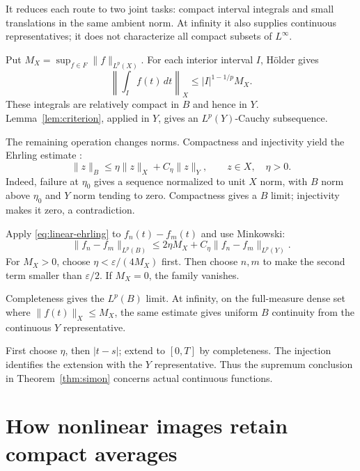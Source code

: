 \documentclass[12pt,reqno]{amsart}
\begin{document}
It reduces each route to two joint tasks: compact interval integrals and small translations in the same ambient norm. At infinity it also supplies continuous representatives; it does not characterize all compact subsets of $L^\infty$.

Put $M_X=\sup_{f\in F}\|f\|_{L^p(X)}$. For each interior interval $I$, H\"older gives
\[
\left\|\int_I f(t)\,dt\right\|_X\le |I|^{1-1/p}M_X.
\]
These integrals are relatively compact in $B$ and hence in $Y$. Lemma~\ref{lem:criterion}, applied in $Y$, gives an $L^p(Y)$-Cauchy subsequence.

The remaining operation changes norms. Compactness and injectivity yield the Ehrling estimate \cite[Lemma 8, pp.~84--85]{S-simon}:
\begin{equation}\label{eq:linear-ehrling}
\|z\|_B\le\eta\|z\|_X+C_\eta\|z\|_Y,\qquad z\in X,\quad\eta>0.
\end{equation}
Indeed, failure at $\eta_0$ gives a sequence normalized to unit $X$ norm, with $B$ norm above $\eta_0$ and $Y$ norm tending to zero. Compactness gives a $B$ limit; injectivity makes it zero, a contradiction.

Apply \eqref{eq:linear-ehrling} to $f_n(t)-f_m(t)$ and use Minkowski:
\begin{equation}\label{eq:linear-upgrade}
\|f_n-f_m\|_{L^p(B)}
\le2\eta M_X+C_\eta\|f_n-f_m\|_{L^p(Y)}.
\end{equation}
For $M_X>0$, choose $\eta<\varepsilon/(4M_X)$ first. Then choose $n,m$ to make the second term smaller than $\varepsilon/2$. If $M_X=0$, the family vanishes.

Completeness gives the $L^p(B)$ limit. At infinity, on the full-measure dense set where $\|f(t)\|_X\le M_X$, the same estimate gives uniform $B$ continuity from the continuous $Y$ representative.

First choose $\eta$, then $|t-s|$; extend to $[0,T]$ by completeness. The injection identifies the extension with the $Y$ representative. Thus the supremum conclusion in Theorem~\ref{thm:simon} concerns actual continuous functions.

\section{How nonlinear images retain compact averages}

\begin{theorem}[Maitre]\label{thm:maitre}

\end{theorem}
\end{document}
